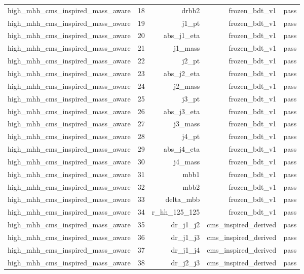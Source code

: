 \begin{table}[htbp]
\begin{tabular}{lrrrr}
high\_mhh\_cms\_inspired\_mass\_aware & 18 & drbb2 & frozen\_bdt\_v1 & pass \\
high\_mhh\_cms\_inspired\_mass\_aware & 19 & j1\_pt & frozen\_bdt\_v1 & pass \\
high\_mhh\_cms\_inspired\_mass\_aware & 20 & abs\_j1\_eta & frozen\_bdt\_v1 & pass \\
high\_mhh\_cms\_inspired\_mass\_aware & 21 & j1\_mass & frozen\_bdt\_v1 & pass \\
high\_mhh\_cms\_inspired\_mass\_aware & 22 & j2\_pt & frozen\_bdt\_v1 & pass \\
high\_mhh\_cms\_inspired\_mass\_aware & 23 & abs\_j2\_eta & frozen\_bdt\_v1 & pass \\
high\_mhh\_cms\_inspired\_mass\_aware & 24 & j2\_mass & frozen\_bdt\_v1 & pass \\
high\_mhh\_cms\_inspired\_mass\_aware & 25 & j3\_pt & frozen\_bdt\_v1 & pass \\
high\_mhh\_cms\_inspired\_mass\_aware & 26 & abs\_j3\_eta & frozen\_bdt\_v1 & pass \\
high\_mhh\_cms\_inspired\_mass\_aware & 27 & j3\_mass & frozen\_bdt\_v1 & pass \\
high\_mhh\_cms\_inspired\_mass\_aware & 28 & j4\_pt & frozen\_bdt\_v1 & pass \\
high\_mhh\_cms\_inspired\_mass\_aware & 29 & abs\_j4\_eta & frozen\_bdt\_v1 & pass \\
high\_mhh\_cms\_inspired\_mass\_aware & 30 & j4\_mass & frozen\_bdt\_v1 & pass \\
high\_mhh\_cms\_inspired\_mass\_aware & 31 & mbb1 & frozen\_bdt\_v1 & pass \\
high\_mhh\_cms\_inspired\_mass\_aware & 32 & mbb2 & frozen\_bdt\_v1 & pass \\
high\_mhh\_cms\_inspired\_mass\_aware & 33 & delta\_mbb & frozen\_bdt\_v1 & pass \\
high\_mhh\_cms\_inspired\_mass\_aware & 34 & r\_hh\_125\_125 & frozen\_bdt\_v1 & pass \\
high\_mhh\_cms\_inspired\_mass\_aware & 35 & dr\_j1\_j2 & cms\_inspired\_derived & pass \\
high\_mhh\_cms\_inspired\_mass\_aware & 36 & dr\_j1\_j3 & cms\_inspired\_derived & pass \\
high\_mhh\_cms\_inspired\_mass\_aware & 37 & dr\_j1\_j4 & cms\_inspired\_derived & pass \\
high\_mhh\_cms\_inspired\_mass\_aware & 38 & dr\_j2\_j3 & cms\_inspired\_derived & pass \\

\end{tabular}
\end{table}

